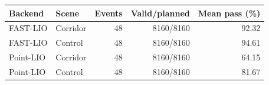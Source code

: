 \begin{tabular}{@{}llrrr@{}}
\toprule
Backend & Scene & Events & Valid/planned & Mean pass (\%)\\\midrule
FAST-LIO & Corridor & 48 & 8160/8160 & 92.32\\
FAST-LIO & Control & 48 & 8160/8160 & 94.61\\
Point-LIO & Corridor & 48 & 8160/8160 & 64.15\\
Point-LIO & Control & 48 & 8160/8160 & 81.67\\
\bottomrule
\end{tabular}
